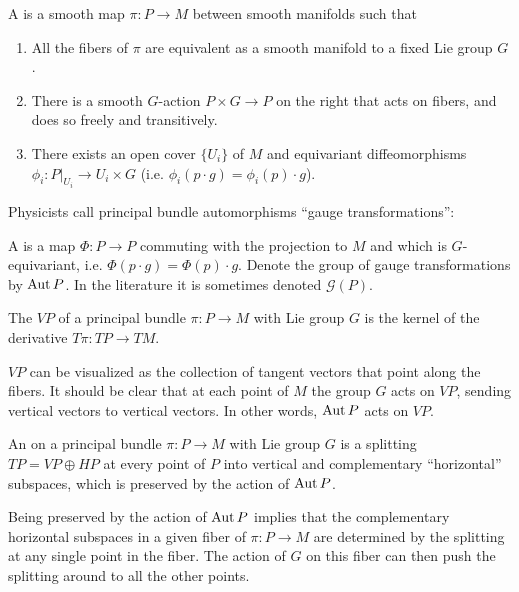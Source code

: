\begin{mydef}
A  is a smooth map \( \pi:P\to M \) between smooth manifolds such that
\begin{enumerate}
\item All the fibers of \( \pi \) are equivalent as a smooth manifold to a fixed Lie group \( G \).
\item There is a smooth \( G \)-action \( P\times G\to P \) on the right that acts on fibers, and does so freely and transitively.
\item There exists an open cover \( \{U_i\} \) of \( M \) and equivariant diffeomorphisms \( \phi_i:P|_{U_i}\to U_i\times G \) (i.e. \( \phi_i(p\cdot g)= \phi_i(p)\cdot g\)).
\end{enumerate}
\end{mydef}

Physicists call principal bundle automorphisms ``gauge transformations'':

\begin{mydef}
A  is a map \( \Phi:P\to P \) commuting with the projection to \( M \) and which is \( G \)-equivariant, i.e. \( \Phi(p\cdot g) = \Phi(p)\cdot g \). Denote the group of gauge transformations by \( \operatorname{Aut} P \). In the literature it is sometimes denoted \( \mathscr{G}(P) \).
\end{mydef}

\begin{mydef}
The  \( VP \) of a principal bundle \( \pi:P\to M \) with Lie group \( G \) is the kernel of the derivative \( T\pi:TP\to TM \).
\end{mydef}

\( VP \) can be visualized as the collection of tangent vectors that point along the fibers. It should be clear that at each point of \( M \) the group \( G \) acts on \( VP \), sending vertical vectors to vertical vectors. In other words, \( \operatorname{Aut} P \) acts on \( VP \).

\begin{mydef}
An  on a principal bundle \( \pi:P\to M \) with Lie group \( G \) is a splitting \( TP=VP\oplus HP \) at every point of \( P \) into vertical and complementary ``horizontal'' subspaces, which is preserved by the action of \( \operatorname{Aut} P \).
\end{mydef}

Being preserved by the action of \( \operatorname{Aut} P \) implies that the complementary horizontal subspaces in a given fiber of \( \pi:P\to M \) are determined by the splitting at any single point in the fiber. The action of \( G \) on this fiber can then push the splitting around to all the other points.


